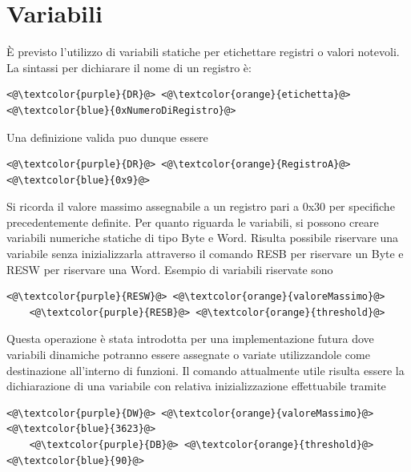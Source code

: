 \section{Variabili}
È previsto l'utilizzo di variabili statiche per etichettare registri o valori notevoli.
La sintassi per dichiarare il nome di un registro è:
\begin{lstlisting}[numbers=none]
    <@\textcolor{purple}{DR}@> <@\textcolor{orange}{etichetta}@> <@\textcolor{blue}{0xNumeroDiRegistro}@>
\end{lstlisting}
Una definizione valida puo dunque essere
\begin{lstlisting}[numbers=none]
    <@\textcolor{purple}{DR}@> <@\textcolor{orange}{RegistroA}@> <@\textcolor{blue}{0x9}@>
\end{lstlisting}
Si ricorda il valore massimo assegnabile a un registro pari a 0x30 per specifiche precedentemente definite.
Per quanto riguarda le variabili, si possono creare variabili numeriche statiche di tipo Byte e Word.
Risulta possibile riservare una variabile senza inizializzarla attraverso il comando RESB per riservare un Byte  e RESW per riservare una Word.
Esempio di variabili riservate sono
\begin{lstlisting}[numbers=none]
    <@\textcolor{purple}{RESW}@> <@\textcolor{orange}{valoreMassimo}@>
    <@\textcolor{purple}{RESB}@> <@\textcolor{orange}{threshold}@>
\end{lstlisting}
Questa operazione è stata introdotta per una implementazione futura dove variabili dinamiche potranno essere assegnate o variate utilizzandole come destinazione all'interno di funzioni.
Il comando attualmente utile risulta essere la dichiarazione di una variabile con relativa inizializzazione effettuabile tramite
\begin{lstlisting}[numbers=none]
    <@\textcolor{purple}{DW}@> <@\textcolor{orange}{valoreMassimo}@> <@\textcolor{blue}{3623}@>
    <@\textcolor{purple}{DB}@> <@\textcolor{orange}{threshold}@> <@\textcolor{blue}{90}@>
\end{lstlisting}
